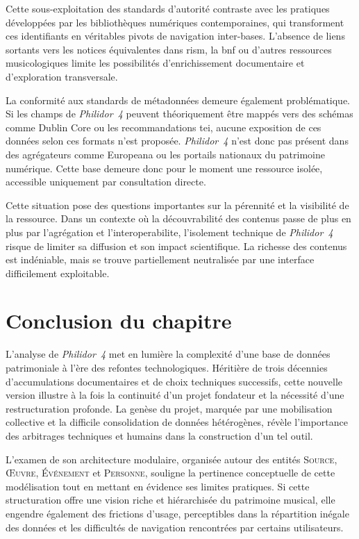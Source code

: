 Cette sous-exploitation des standards d'autorité contraste avec les pratiques développées par les bibliothèques numériques contemporaines, qui transforment ces identifiants en véritables pivots de navigation inter-bases. L'absence de liens sortants vers les notices équivalentes dans \gls{rism}, la \gls{bnf} ou d'autres ressources musicologiques limite les possibilités d'enrichissement documentaire et d'exploration transversale.

La conformité aux standards de métadonnées demeure également problématique. Si les champs de \textit{Philidor~4} peuvent théoriquement être mappés vers des schémas comme Dublin Core ou les recommandations \gls{tei}, aucune exposition de ces données selon ces formats n'est proposée. \textit{Philidor~4} n'est donc pas présent dans des agrégateurs comme Europeana ou les portails nationaux du patrimoine numérique. Cette base demeure donc pour le moment une ressource isolée, accessible uniquement par consultation directe.

Cette situation pose des questions importantes sur la pérennité et la visibilité de la ressource. Dans un contexte où la découvrabilité des contenus passe de plus en plus par l'agrégation et l'\gls{interoperabilite}, l'isolement technique de \textit{Philidor~4} risque de limiter sa diffusion et son impact scientifique. La richesse des contenus est indéniable, mais se trouve partiellement neutralisée par une interface difficilement exploitable.

\section*{Conclusion du chapitre}

L’analyse de \textit{Philidor~4} met en lumière la complexité d’une base de données patrimoniale à l’ère des refontes technologiques. Héritière de trois décennies d’accumulations documentaires et de choix techniques successifs, cette nouvelle version illustre à la fois la continuité d’un projet fondateur et la nécessité d’une restructuration profonde. La genèse du projet, marquée par une mobilisation collective et la difficile consolidation de données hétérogènes, révèle l’importance des arbitrages techniques et humains dans la construction d’un tel outil.

L’examen de son architecture modulaire, organisée autour des entités \textsc{Source}, \textsc{Œuvre}, \textsc{Événement} et \textsc{Personne}, souligne la pertinence conceptuelle de cette modélisation tout en mettant en évidence ses limites pratiques. Si cette structuration offre une vision riche et hiérarchisée du patrimoine musical, elle engendre également des frictions d’usage, perceptibles dans la répartition inégale des données et les difficultés de navigation rencontrées par certains utilisateurs.

